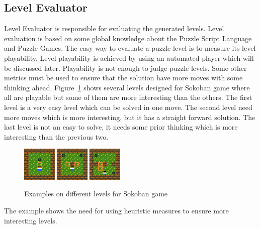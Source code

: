 \documentclass[letterpaper]{article}
\newcommand{\figref}[1]{Figure~\ref{Figure:#1}}
\begin{document}
\subsection{Level Evaluator}\label{Section:levelEvaluator}
Level Evaluator is responsible for evaluating the generated levels. Level evaluation is based on some global knowledge about the Puzzle Script Language and Puzzle Games. The easy way to evaluate a puzzle level is to measure its level playability. Level playability is achieved by using an automated player which will be discussed later. Playability is not enough to judge puzzle levels. Some other metrics must be used to ensure that the solution have more moves with some thinking ahead. \figref{diffLevelsSokoban} shows several levels designed for Sokoban game where all are playable but some of them are more interesting than the others. The first level is a very easy level which can be solved in one move. The second level need more moves which is more interesting, but it has a straight forward solution. The last level is not an easy to solve, it needs some prior thinking which is more interesting than the previous two.

\begin{figure}[ht]
  	\centering
    \includegraphics[width=0.45\textwidth]{Images/diffLevelsSokoban}
    \label{Figure:diffLevelsSokoban}
    \caption{Examples on different levels for Sokoban game}
\end{figure}

The example shows the need for using heuristic measures to ensure more interesting levels.
\end{document}
